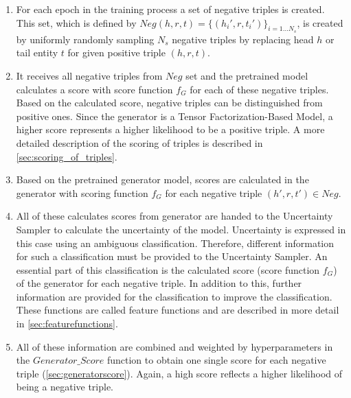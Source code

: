 \begin{enumerate}
    \item For each epoch in the training process a set of negative triples is created.
    This set, which is defined by $Neg(h,r,t)=\{(h_i',r,t_i')\}_{i=1\dots N_s}$, is created by uniformly randomly sampling $N_s$ negative triples by replacing head $h$ or tail entity $t$ for given positive triple $(h, r, t)$.
    
    \item 
    It receives all negative triples from $Neg$ set and the pretrained model calculates a score with score function $f_G$ for each of these negative triples.
    Based on the calculated score, negative triples can be distinguished from positive ones. Since the generator is a Tensor Factorization-Based Model, a higher score represents a higher likelihood to be a positive triple.
    A more detailed description of the scoring of triples is described in   \autoref{sec:scoring_of_triples}.
    
    \item 
    Based on the pretrained generator model, scores are calculated in the generator with scoring function $f_G$ for each negative triple $(h',r,t') \in Neg$.
    
    \item 
    All of these calculates scores from generator are handed to the Uncertainty Sampler to calculate the uncertainty of the model.
    Uncertainty is expressed in this case using an ambiguous classification.
    Therefore, different information for such a classification must be provided to the Uncertainty Sampler.
    An essential part of this classification is the calculated score (score function $f_G$) of the generator for each negative triple.
    In addition to this, further information are provided for the classification to improve the classification.
    These functions are called feature functions and are described in more detail in \autoref{sec:featurefunctions}.
    
    \item 
    All of these information are combined and weighted by hyperparameters in the $Generator\_Score$ function to obtain one single score for each negative triple (\autoref{sec:generatorscore}).
    Again, a high score reflects a higher likelihood of being a negative triple.


\end{enumerate}
